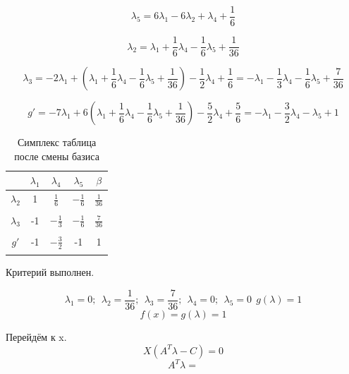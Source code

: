 \documentclass{article}
\begin{document}
\[\lambda_5 = 6\lambda_1-6\lambda_2+\lambda_4+\frac{1}{6}\]

\[\lambda_2 = \lambda_1 +\frac{1}{6}\lambda_4 -\frac{1}{6}\lambda_5+\frac{1}{36}\]

\[\lambda_3 = -2\lambda_1+(\lambda_1 +\frac{1}{6}\lambda_4 -\frac{1}{6}\lambda_5+\frac{1}{36})-\frac{1}{2}\lambda_4+\frac{1}{6}=
-\lambda_1 - \frac{1}{3}\lambda_4 - \frac{1}{6}\lambda_5 + \frac{7}{36}\]

\[g' = -7\lambda_1+6(\lambda_1 +\frac{1}{6}\lambda_4 -\frac{1}{6}\lambda_5+\frac{1}{36})-\frac{5}{2}\lambda_4+\frac{5}{6} = 
-\lambda_1 - \frac{3}{2}\lambda_4 - \lambda_5 +1\]

\begin{table}[H]
    \centering
    \caption{Симплекс таблица после смены базиса}
    \begin{tabular}{|c|c|c|c|c|}
    \hline
               &$\lambda_1$&$\lambda_4$&$\lambda_5$&$\beta$\\\hline
    $\lambda_2$&1&$\frac{1}{6}$&$-\frac{1}{6}$&$\frac{1}{36}$\\
    &&&&\\\hline
    $\lambda_3$&-1&$-\frac{1}{3}$&$-\frac{1}{6}$&$\frac{7}{36}$\\
    &&&&\\\hline
    $g'$&-1&$-\frac{3}{2}$&-1&1\\
    &&&&\\\hline
    \end{tabular}
\end{table}
Критерий выполнен.

\[\lambda_1 = 0;\ \ \lambda_2 = \frac{1}{36};\ \ \lambda_3 = \frac{7}{36};\ \ \lambda_4 = 0;\ \ \lambda_5 = 0 \ \ g(\lambda) = 1\]
\[f(x) = g(\lambda) = 1\]



Перейдём к x.
\[X(A^T\lambda - C) = 0\]
\[A^T\lambda =\]
\end{document}
